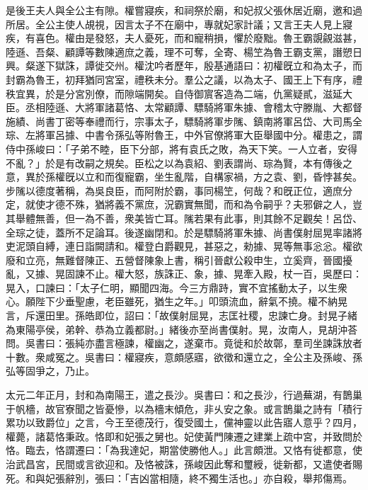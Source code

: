 \begin{pinyinscope}
是後王夫人與全公主有隙。權嘗寢疾，和祠祭於廟，和妃叔父張休居近廟，邀和過所居。全公主使人覘視，因言太子不在廟中，專就妃家計議；又言王夫人見上寢疾，有喜色。權由是發怒，夫人憂死，而和寵稍損，懼於廢黜。魯王霸覬覦滋甚，陸遜、吾粲、顧譚等數陳適庶之義，理不可奪，全寄、楊笁為魯王霸支黨，譖愬日興。粲遂下獄誅，譚徙交州。權沈吟者歷年，殷基通語曰：初權旣立和為太子，而封霸為魯王，初拜猶同宮室，禮秩未分。羣公之議，以為太子、國王上下有序，禮秩宜異，於是分宮別僚，而隙端開矣。自侍御賔客造為二端，仇黨疑貳，滋延大臣。丞相陸遜、大將軍諸葛恪、太常顧譚、驃騎將軍朱據、會稽太守滕胤、大都督施績、尚書丁密等奉禮而行，宗事太子，驃騎將軍步隲、鎮南將軍呂岱、大司馬全琮、左將軍呂據、中書令孫弘等附魯王，中外官僚將軍大臣舉國中分。權患之，謂侍中孫峻曰：「子弟不睦，臣下分部，將有袁氏之敗，為天下笑。一人立者，安得不亂？」於是有改嗣之規矣。臣松之以為袁紹、劉表謂尚、琮為賢，本有傳後之意，異於孫權旣以立和而復寵霸，坐生亂階，自構家禍，方之袁、劉，昏悖甚矣。步隲以德度著稱，為吳良臣，而阿附於霸，事同楊笁，何哉？和旣正位，適庶分定，就使才德不殊，猶將義不黨庶，況霸實無聞，而和為令嗣乎？夫邪僻之人，豈其舉體無善，但一為不善，衆美皆亡耳。隲若果有此事，則其餘不足觀矣！呂岱、全琮之徒，蓋所不足論耳。後遂幽閉和。於是驃騎將軍朱據、尚書僕射屈晃率諸將吏泥頭自縛，連日詣闕請和。權登白爵觀見，甚惡之，勑據、晃等無事忩忩。權欲廢和立亮，無難督陳正、五營督陳象上書，稱引晉獻公殺申生，立奚齊，晉國擾亂，又據、晃固諫不止。權大怒，族誅正、象，據、晃牽入殿，杖一百，吳歷曰：晃入，口諫曰：「太子仁明，顯聞四海。今三方鼎跱，實不宜搖動太子，以生衆心。願陛下少垂聖慮，老臣雖死，猶生之年。」叩頭流血，辭氣不撓。權不納晃言，斥還田里。孫皓即位，詔曰：「故僕射屈晃，志匡社稷，忠諫亡身。封晃子緒為東陽亭侯，弟幹、恭為立義都尉。」緒後亦至尚書僕射。晃，汝南人，見胡沖荅問。吳書曰：張純亦盡言極諫，權幽之，遂棄市。竟徙和於故鄣，羣司坐諫誅放者十數。衆咸冤之。吳書曰：權寢疾，意頗感寤，欲徵和還立之，全公主及孫峻、孫弘等固爭之，乃止。

太元二年正月，封和為南陽王，遣之長沙。吳書曰：和之長沙，行過蕪湖，有鵲巢于帆檣，故官寮聞之皆憂慘，以為檣末傾危，非乆安之象。或言鵲巢之詩有「積行累功以致爵位」之言，今王至德茂行，復受國土，儻神靈以此告寤人意乎？四月，權薨，諸葛恪秉政。恪即和妃張之舅也。妃使黃門陳遷之建業上疏中宮，并致問於恪。臨去，恪謂遷曰：「為我達妃，期當使勝他人。」此言頗泄。又恪有徙都意，使治武昌宮，民間或言欲迎和。及恪被誅，孫峻因此奪和璽綬，徙新都，又遣使者賜死。和與妃張辭別，張曰：「吉凶當相隨，終不獨生活也。」亦自殺，舉邦傷焉。


\end{pinyinscope}
